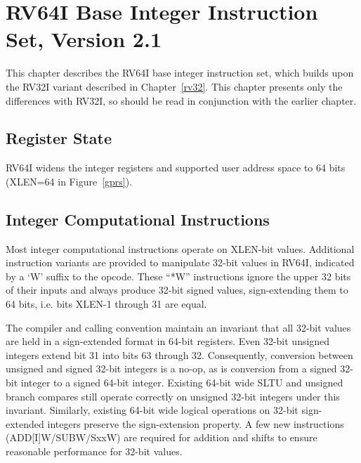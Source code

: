 \chapter{RV64I Base Integer Instruction Set, Version 2.1}
\label{rv64}

This chapter describes the RV64I base integer instruction set, which
builds upon the RV32I variant described in Chapter~\ref{rv32}.  This
chapter presents only the differences with RV32I, so should be read in
conjunction with the earlier chapter.

\section{Register State}

RV64I widens the integer registers and supported user address space to
64 bits (XLEN=64 in Figure~\ref{gprs}).

\section{Integer Computational Instructions}

Most integer computational instructions operate on XLEN-bit values.
Additional instruction variants are provided to manipulate 32-bit
values in RV64I, indicated by a `W' suffix to the opcode.  These
``*W'' instructions ignore the upper 32 bits of their inputs and
always produce 32-bit signed values, sign-extending them to 64 bits,
i.e. bits XLEN-1 through 31 are equal.

\begin{commentary}
The compiler and calling convention maintain an invariant that all 32-bit
values are held in a sign-extended format in 64-bit registers.  Even 32-bit
unsigned integers extend bit 31 into bits 63 through 32.  Consequently,
conversion between unsigned and signed 32-bit integers is a no-op,
as is conversion from a signed 32-bit integer to a signed 64-bit
integer.  Existing 64-bit wide SLTU and unsigned branch compares still operate
correctly on unsigned 32-bit integers under this invariant.  Similarly,
existing 64-bit wide logical operations on 32-bit sign-extended integers
preserve the sign-extension property.  A few new instructions
(ADD[I]W/SUBW/SxxW) are required for addition and shifts to ensure reasonable
performance for 32-bit values.
\end{commentary}

\newpage
